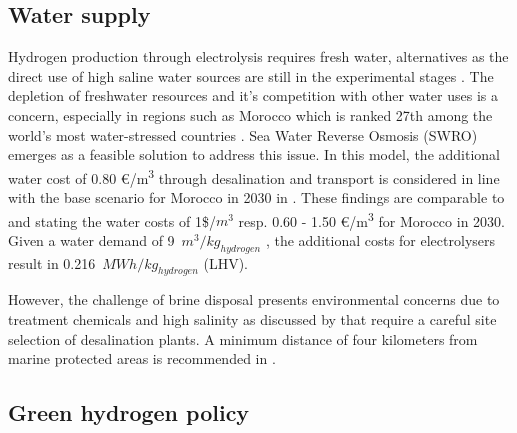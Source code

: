 \subsection*{Water supply}
\label{subsec:water_supply}
Hydrogen production through electrolysis requires fresh water, alternatives as the direct use of high saline water sources are still in the experimental stages \cite{Tong2020}. The depletion of freshwater resources and it's competition with other water uses is a concern, especially in regions such as Morocco which is ranked 27th among the world's most water-stressed countries \cite{Maddocks2015}. 
Sea Water Reverse Osmosis (SWRO) emerges as a feasible solution to address this issue. In this model, the additional water cost of 0.80 €/\si{\cubic\metre} through desalination and transport is considered in line with the base scenario for Morocco in 2030 in \cite{Caldera2020}. These findings are comparable to \cite{Kettani2020} and \cite{Caldera2016} stating the water costs of 1\$/$m^3$ resp. 0.60 - 1.50 €/\si{\cubic\metre} for Morocco in 2030. Given a water demand of 9~$m^3/kg_{hydrogen}$
\cite{Hampp2023}, the additional costs for electrolysers result in 0.216~$MWh/kg_{hydrogen}$ (LHV).

However, the challenge of brine disposal presents environmental concerns due to treatment chemicals and high salinity as discussed by \cite{Thomann2022, Dresp2019, Tonelli2023} that require a careful site selection of desalination plants. A minimum distance of four kilometers from marine protected areas is recommended in \cite{Thomann2022}.


\subsection*{Green hydrogen policy}
\label{subsec:green_hydrogen_constraint}

